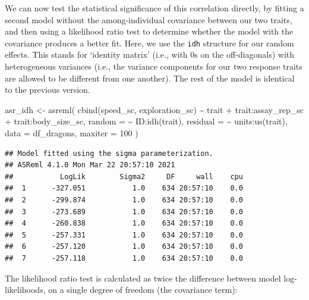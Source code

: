 \documentclass[
  12pt,
]{book}
\newenvironment{Shaded}{\begin{snugshade}}{\end{snugshade}}
\newcommand{\AttributeTok}[1]{\textcolor[rgb]{0.77,0.63,0.00}{#1}}
\newcommand{\ConstantTok}[1]{\textcolor[rgb]{0.00,0.00,0.00}{#1}}
\newcommand{\DecValTok}[1]{\textcolor[rgb]{0.00,0.00,0.81}{#1}}
\newcommand{\FunctionTok}[1]{\textcolor[rgb]{0.00,0.00,0.00}{#1}}
\newcommand{\NormalTok}[1]{#1}
\newcommand{\OtherTok}[1]{\textcolor[rgb]{0.56,0.35,0.01}{#1}}
\newcommand{\SpecialCharTok}[1]{\textcolor[rgb]{0.00,0.00,0.00}{#1}}
\begin{document}
We can now test the statistical significance of this correlation directly, by fitting a second model without the among-individual covariance between our two traits, and then using a likelihood ratio test to determine whether the model with the covariance produces a better fit.
Here, we use the \texttt{idh} structure for our random effects. This stands for `identity matrix' (i.e., with 0s on the off-diagonals) with heterogeneous variances (i.e., the variance components for our two response traits are allowed to be different from one another).
The rest of the model is identical to the previous version.

\begin{Shaded}
\begin{Highlighting}[]
\NormalTok{asr\_idh }\OtherTok{\textless{}{-}} \FunctionTok{asreml}\NormalTok{(}
    \FunctionTok{cbind}\NormalTok{(speed\_sc, exploration\_sc) }\SpecialCharTok{\textasciitilde{}}\NormalTok{ trait }\SpecialCharTok{+}
\NormalTok{    trait}\SpecialCharTok{:}\NormalTok{assay\_rep\_sc }\SpecialCharTok{+}\NormalTok{ trait}\SpecialCharTok{:}\NormalTok{body\_size\_sc,}
  \AttributeTok{random =} \SpecialCharTok{\textasciitilde{}}\NormalTok{ ID}\SpecialCharTok{:}\FunctionTok{idh}\NormalTok{(trait),}
  \AttributeTok{residual =} \SpecialCharTok{\textasciitilde{}}\NormalTok{ units}\SpecialCharTok{:}\FunctionTok{us}\NormalTok{(trait),}
  \AttributeTok{data =}\NormalTok{ df\_dragons,}
  \AttributeTok{maxiter =} \DecValTok{100}
\NormalTok{)}
\end{Highlighting}
\end{Shaded}

\begin{verbatim}
## Model fitted using the sigma parameterization.
## ASReml 4.1.0 Mon Mar 22 20:57:10 2021
##           LogLik        Sigma2     DF     wall    cpu
##  1      -327.051           1.0    634 20:57:10    0.0
##  2      -299.874           1.0    634 20:57:10    0.0
##  3      -273.689           1.0    634 20:57:10    0.0
##  4      -260.838           1.0    634 20:57:10    0.0
##  5      -257.331           1.0    634 20:57:10    0.0
##  6      -257.120           1.0    634 20:57:10    0.0
##  7      -257.118           1.0    634 20:57:10    0.0
\end{verbatim}

The likelihood ratio test is calculated as twice the difference between model log-likelihoods, on a single degree of freedom (the covariance term):

\begin{Shaded}
\end{Shaded}
\end{document}
